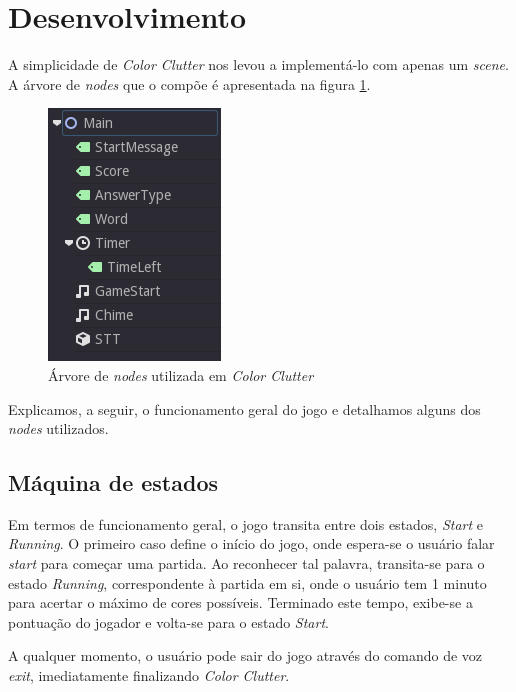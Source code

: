 
\section{Desenvolvimento}

A simplicidade de \textit{Color Clutter} nos levou a implementá-lo com apenas um \textit{scene}. A árvore de \textit{nodes} que o compõe é apresentada na figura \ref{color-clutter-nodes}.

\begin{figure}[H]
  \centering
  \includegraphics[width=.3\textwidth]{image/color-clutter-nodes}
  \caption{Árvore de \textit{nodes} utilizada em \textit{Color Clutter}}
  \label{color-clutter-nodes}
\end{figure}

Explicamos, a seguir, o funcionamento geral do jogo e detalhamos alguns dos \textit{nodes} utilizados.


\subsection{Máquina de estados}

Em termos de funcionamento geral, o jogo transita entre dois estados, \textit{Start} e \textit{Running}. O primeiro caso define o início do jogo, onde espera-se o usuário falar \textit{start} para começar uma partida. Ao reconhecer tal palavra, transita-se para o estado \textit{Running}, correspondente à partida em si, onde o usuário tem 1 minuto para acertar o máximo de cores possíveis. Terminado este tempo, exibe-se a pontuação do jogador e volta-se para o estado \textit{Start}.

A qualquer momento, o usuário pode sair do jogo através do comando de voz \textit{exit}, imediatamente finalizando \textit{Color Clutter}.

